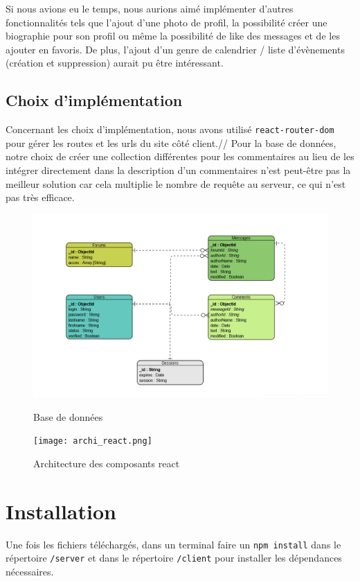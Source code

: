 \documentclass{article}
\begin{document}
Si nous avions eu le temps, nous aurions aimé implémenter d'autres fonctionnalités tels que l'ajout d'une photo de profil, la possibilité créer une biographie pour son profil ou même la possibilité de like des messages et de les ajouter en favoris.
De plus, l'ajout d'un genre de calendrier / liste d'évènements (création et suppression) aurait pu être intéressant.

\subsection{Choix d'implémentation}
Concernant les choix d'implémentation, nous avons utilisé \texttt{react-router-dom} pour gérer les routes et les urls du site côté client.//
Pour la base de données, notre choix de créer une collection différentes pour les commentaires au lieu de les intégrer directement dans la description d'un commentaires n'est peut-être pas la meilleur solution car cela multiplie le nombre de requête au serveur, ce qui n'est pas très efficace.

\begin{figure}
    \includegraphics[width=1\textwidth]{BDD.png}
    \caption{Base de données}
    \texttt{[image: archi\_react.png]}
    \caption{Architecture des composants react}
\end{figure}

\newpage

\section{Installation}
Une fois les fichiers téléchargés, dans un terminal faire un \texttt{npm install} dans le répertoire \texttt{/server} et dans le répertoire \texttt{/client} pour installer les dépendances nécessaires.
\end{document}
